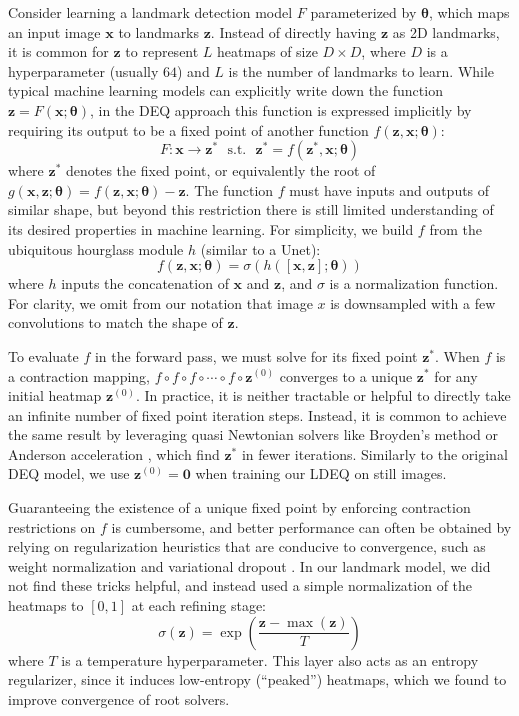 \documentclass[10pt,twocolumn,letterpaper]{article}
\newcommand{\bo}[1]{\bm{#1}}
\def\vtheta{{\bm{\theta}}}
\def\vx{{\bm{x}}}
\def\vz{{\bm{z}}}
\begin{document}
Consider learning a landmark detection model $F$ parameterized by $\vtheta$, which maps an input image $\vx$ to landmarks $\vz$. Instead of directly having $\vz$ as 2D landmarks, it is common for $\vz$ to represent $L$ heatmaps of size $D \times D$, where $D$ is a hyperparameter (usually $64$) and $L$ is the number of landmarks to learn. While typical machine learning models can explicitly write down the function $\vz = F(\vx; \vtheta)$, in the DEQ approach this function is expressed implicitly by requiring its output to be a fixed point of another function $f(\vz, \vx; \vtheta)$:
\begin{equation}
 F : \vx \rightarrow \vz^* ~~~ \text{s.t.}~~~ \vz^* = f(\vz^*, \vx; \vtheta)  
\end{equation}
where $\vz^*$ denotes the fixed point, or equivalently the root of $g(\vx, \vz; \vtheta) = f(\vz, \vx; \vtheta) - \vz$. The function $f$ must have inputs and outputs of similar shape, but beyond this restriction there is still limited understanding of its desired properties in machine learning. For simplicity, we build $f$ from the ubiquitous hourglass module $h$ (similar to a Unet): 
\begin{equation}
f(\vz, \vx; \vtheta) = \sigma ( h([\vx,\vz]; \vtheta) )
\end{equation}
where $h$ inputs the concatenation of $\vx$ and $\vz$, and $\sigma$ is a normalization function. For clarity, we omit from our notation that image $x$ is downsampled with a few convolutions to match the shape of $\vz$. 

To evaluate $f$ in the forward pass, we must solve for its fixed point $\vz^*$. When $f$ is a contraction mapping, $f \circ f \circ f \circ \cdots \circ f \circ \vz^{(0)}$ converges to a unique $\vz^*$ for any initial heatmap $\vz^{(0)}$. In practice, it is neither tractable or helpful to directly take an infinite number of fixed point iteration steps. Instead, it is common to achieve the same result by leveraging quasi Newtonian solvers like Broyden's method \cite{Broyden1965ACO} or Anderson acceleration \cite{Anderson1965IterativeProcedure}, which find $\vz^*$ in fewer iterations. Similarly to the original DEQ model, we use $\vz^{(0)} = \bo{0}$ when training our LDEQ on still images.

Guaranteeing the existence of a unique fixed point by enforcing contraction restrictions on $f$ is cumbersome, and better performance can often be obtained by relying on regularization heuristics that are conducive to convergence, such as weight normalization and variational dropout \cite{Bai2020MDEQs}. In our landmark model, we did not find these tricks helpful, and instead used a simple normalization of the heatmaps to $[0,1]$ at each refining stage:
\begin{equation}
\sigma(\vz) = \exp \left(\frac{\vz - \max(\vz)}{T}\right)
\end{equation}
where $T$ is a temperature hyperparameter. This layer also acts as an entropy regularizer, since it induces low-entropy (``peaked'') heatmaps, which we found to improve convergence of root solvers. 
\end{document}
